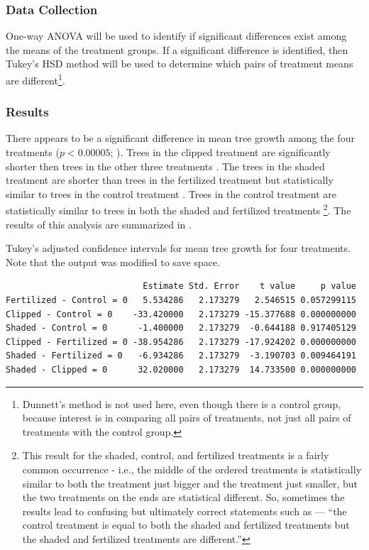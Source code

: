 \documentclass[10pt,openany]{book}\usepackage[]{graphicx}\usepackage[]{color}
\makeatletter
\newenvironment{kframe}{%
 \def\at@end@of@kframe{}%
 \ifinner\ifhmode%
  \def\at@end@of@kframe{\end{minipage}}%
  \begin{minipage}{\columnwidth}%
 \fi\fi%
 \def\FrameCommand##1{\hskip\@totalleftmargin \hskip-\fboxsep
 \colorbox{shadecolor}{##1}\hskip-\fboxsep
     \hskip-\linewidth \hskip-\@totalleftmargin \hskip\columnwidth}%
 \MakeFramed {\advance\hsize-\width
   \@totalleftmargin\z@ \linewidth\hsize
   \@setminipage}}%
 {\par\unskip\endMakeFramed%
 \at@end@of@kframe}
\newenvironment{knitrout}{}{} %
\makeatother
\begin{document}
\subsubsection*{Data Collection}
One-way ANOVA will be used to identify if significant differences exist among the means of the treatment groups.  If a significant difference is identified, then Tukey's HSD method will be used to determine which pairs of treatment means are different\footnote{Dunnett's method is not used here, even though there is a control group, because interest is in comparing all pairs of treatments, not just all pairs of treatments with the control group.}.

\subsubsection*{Results}
There appears to be a significant difference in mean tree growth among the four treatments ($p<0.00005$; ).  Trees in the clipped treatment are significantly shorter then trees in the other three treatments .  The trees in the shaded treatment are shorter than trees in the fertilized treatment but statistically similar to trees in the control treatment .  Trees in the control treatment are statistically similar to trees in both the shaded and fertilized treatments \footnote{This result for the shaded, control, and fertilized treatments is a fairly common occurrence - i.e., the middle of the ordered treatments is statistically similar to both the treatment just bigger and the treatment just smaller, but the two treatments on the ends are statistical different.  So, sometimes the results lead to confusing but ultimately correct statements such as --- ``the control treatment is equal to both the shaded and fertilized treatments but the shaded and fertilized treatments are different.''}.  The results of this analysis are summarized in .

\begin{table}[h]
  \centering
  \caption{Tukey's adjusted confidence intervals for mean tree growth for four treatments. Note that the output was modified to save space.}\label{tab:OWAEx2HSD}
\begin{knitrout}
\color{fgcolor}\begin{kframe}
\begin{verbatim}
                           Estimate Std. Error    t value     p value
Fertilized - Control = 0   5.534286   2.173279   2.546515 0.057299115
Clipped - Control = 0    -33.420000   2.173279 -15.377688 0.000000000
Shaded - Control = 0      -1.400000   2.173279  -0.644188 0.917405129
Clipped - Fertilized = 0 -38.954286   2.173279 -17.924202 0.000000000
Shaded - Fertilized = 0   -6.934286   2.173279  -3.190703 0.009464191
Shaded - Clipped = 0      32.020000   2.173279  14.733500 0.000000000
\end{verbatim}
\end{kframe}
\end{knitrout}
\end{table}
\end{document}
